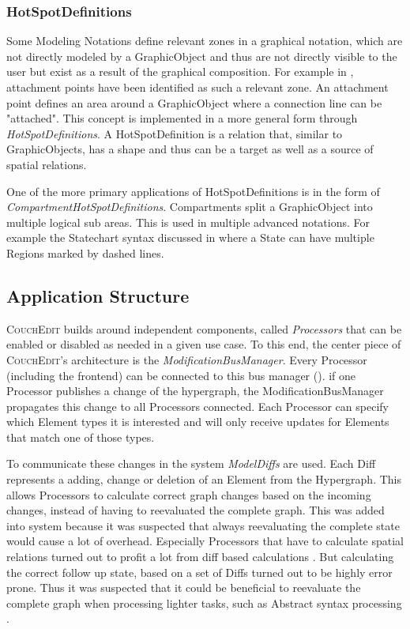 \subsubsection{HotSpotDefinitions}
\label{sec:hotspotdefinitions}
Some Modeling Notations define relevant zones in a graphical notation, which are not directly modeled by a GraphicObject and thus are not directly visible to the user but exist as a result of the graphical composition. For example in \cite{bottoni_suite_2004}, attachment points have been identified as such a relevant zone. An attachment point defines an area around a GraphicObject where a connection line can be "attached". This concept is implemented in a more general form through \emph{HotSpotDefinitions}. A HotSpotDefinition is a relation that, similar to GraphicObjects, has a shape and thus can be a target as well as a source of spatial relations.

One of the more primary applications of HotSpotDefinitions is in the form of \emph{CompartmentHotSpotDefinitions}. Compartments split a GraphicObject into multiple logical sub areas. This is used in multiple advanced notations. For example the Statechart syntax discussed in  where a State can have multiple Regions marked by dashed lines. 

\subsection{Application Structure}
\textsc{CouchEdit} builds around independent components, called \emph{Processors} that can be enabled or disabled as needed in a given use case. To this end, the center piece of \textsc{CouchEdit}'s architecture is the \emph{ModificationBusManager}. Every Processor (including the frontend) can be connected to this bus manager (). if one Processor publishes a change of the hypergraph, the ModificationBusManager propagates this change to all Processors connected. Each Processor can specify which Element types it is interested and will only receive updates for Elements that match one of those types. 

To communicate these changes in the system \emph{ModelDiffs} are used. Each Diff represents a adding, change or deletion of an Element from the Hypergraph. This allows Processors to calculate correct graph changes based on the incoming changes, instead of having to reevaluated the complete graph. This was added into system because it was suspected that always reevaluating the complete state would cause a lot of overhead. Especially Processors that have to calculate spatial relations turned out to profit a lot from diff based calculations \cite{nachreiner_couchedit_2020}. But calculating the correct follow up state, based on a set of Diffs turned out to be highly error prone. Thus it was suspected that it could be beneficial to reevaluate the complete graph when processing lighter tasks, such as Abstract syntax processing \cite{nachreiner_couchedit_2020}.

